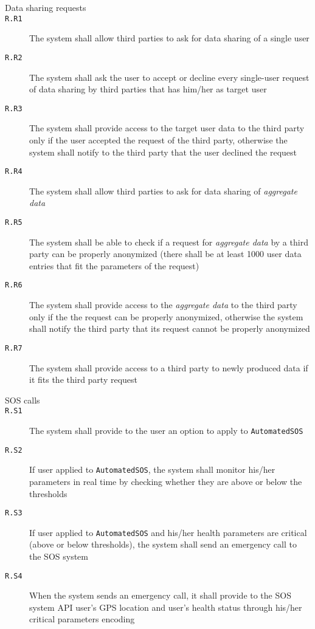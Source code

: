 \begin{description}
      \item[Data sharing requests]
      \item[\texttt{R.R1}] The system shall allow third parties to ask for data sharing of a single user
      \item[\texttt{R.R2}] The system shall ask the user to accept or decline every single-user request of data sharing by third parties that has him/her as target user
      \item[\texttt{R.R3}] The system shall provide access to the target user data to the third party only if the user accepted the request of the third party, otherwise the system shall notify to the third party that the user declined the request
      \item[\texttt{R.R4}] The system shall allow third parties to ask for data sharing of \textit{aggregate data}
      \item[\texttt{R.R5}] The system shall be able to check if a request for \textit{aggregate data} by a third party can be properly anonymized (there shall be at least 1000 user data entries that fit the parameters of the request)
      \item[\texttt{R.R6}] The system shall provide access to the \textit{aggregate data} to the third party only if the the request can be properly anonymized, otherwise the system shall notify the third party that its request cannot be properly anonymized
      \item[\texttt{R.R7}] The system shall provide access to a third party to newly produced data if it fits the third party request

      \item[SOS calls]
      \item[\texttt{R.S1}] The system shall provide to the user an option to apply to \texttt{AutomatedSOS}
      \item[\texttt{R.S2}] If user applied to \texttt{AutomatedSOS}, the system shall monitor his/her parameters in real time by checking whether they are above or below the thresholds
      \item[\texttt{R.S3}] If user applied to \texttt{AutomatedSOS} and his/her health parameters are critical (above or below thresholds), the system shall send an emergency call to the SOS system
      \item[\texttt{R.S4}] When the system sends an emergency call, it shall provide to the SOS system API user's GPS location and user's health status through his/her critical parameters encoding

    \end{description}

